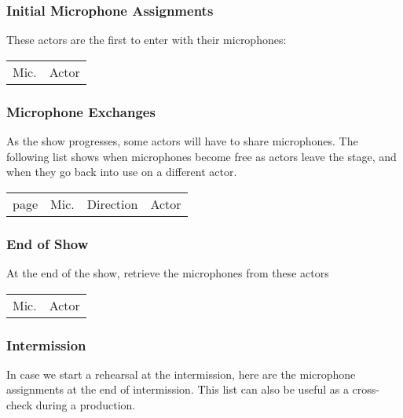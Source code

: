 \documentclass[letterpaper]{article}
\begin{document}
\subsubsection {Initial Microphone Assignments}

These actors are the first to enter with their microphones:

\begin{center}
\begin{longtable}{|l|l|}
\hline Mic. & Actor \endhead \hline

\end{longtable}
\end{center}

\subsubsection {Microphone Exchanges}

As the show progresses, some actors will have to share microphones. The
following list shows when microphones become free as actors leave the
stage, and when they go back into use on a different actor.

\begin{center}
\begin{longtable}{|l|l|l|l|}
\hline page & Mic. & Direction & Actor \endhead \hline

\end{longtable}
\end{center}

\subsubsection {End of Show}

At the end of the show, retrieve the microphones from these actors

\begin{center}
\begin{longtable}{|l|l|}
\hline Mic. & Actor \endhead \hline

\end{longtable}
\end{center}

\subsubsection {Intermission}

In case we start a rehearsal at the intermission, here are the microphone
assignments at the end of intermission.  This list can also be useful as a 
cross-check during a production.
\end{document}
